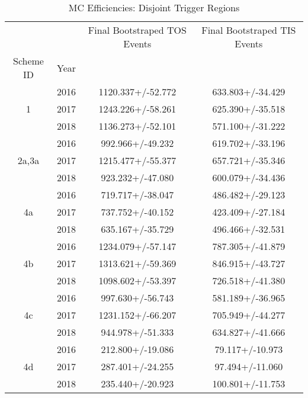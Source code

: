 \begin{table}
\centering
\caption{MC Efficiencies: Disjoint Trigger Regions}
\label{tab:tr_1}
\begin{tabular}{cccc}
\toprule
   &      & Final Bootstraped TOS Events & Final Bootstraped TIS Events \\
Scheme ID & Year &                              &                              \\
\midrule
\multirow{3}{*}{1} & 2016 &            1120.337+/-52.772 &             633.803+/-34.429 \\
   & 2017 &            1243.226+/-58.261 &             625.390+/-35.518 \\
   & 2018 &            1136.273+/-52.101 &             571.100+/-31.222 \\
\cline{1-4}
\multirow{3}{*}{2a,3a} & 2016 &             992.966+/-49.232 &             619.702+/-33.196 \\
   & 2017 &            1215.477+/-55.377 &             657.721+/-35.346 \\
   & 2018 &             923.232+/-47.080 &             600.079+/-34.436 \\
\cline{1-4}
\multirow{3}{*}{4a} & 2016 &             719.717+/-38.047 &             486.482+/-29.123 \\
   & 2017 &             737.752+/-40.152 &             423.409+/-27.184 \\
   & 2018 &             635.167+/-35.729 &             496.466+/-32.531 \\
\cline{1-4}
\multirow{3}{*}{4b} & 2016 &            1234.079+/-57.147 &             787.305+/-41.879 \\
   & 2017 &            1313.621+/-59.369 &             846.915+/-43.727 \\
   & 2018 &            1098.602+/-53.397 &             726.518+/-41.380 \\
\cline{1-4}
\multirow{3}{*}{4c} & 2016 &             997.630+/-56.743 &             581.189+/-36.965 \\
   & 2017 &            1231.152+/-66.207 &             705.949+/-44.277 \\
   & 2018 &             944.978+/-51.333 &             634.827+/-41.666 \\
\cline{1-4}
\multirow{3}{*}{4d} & 2016 &             212.800+/-19.086 &              79.117+/-10.973 \\
   & 2017 &             287.401+/-24.255 &              97.494+/-11.060 \\
   & 2018 &             235.440+/-20.923 &             100.801+/-11.753 \\

\end{tabular}
\end{table}
